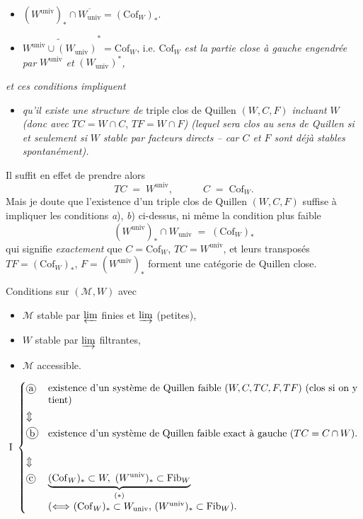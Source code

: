 \documentclass[11pt]{article}
\newcommand{\printedpage}[1]{\marginpar{\footnotesize p.~#1}}
\newcommand{\msp}[1]{\marginpar{\footnotesize [#1]}}
\newcommand{\Cof}{\mathrm{Cof}}
\newcommand{\Fib}{\mathrm{Fib}}
\newcommand{\univ}{\mathrm{univ}}
\newcommand{\cercle}[1]{\mbox{\tikz[baseline=(c.base)]\node[draw,circle,inner sep=1pt](c){#1};}}
\begin{document}
\msp{page 25}
\begin{itemize}[leftmargin=3em]
\item[\cercle{a}] $(W^{\univ})_* \cap \overline{W_{\univ}} = (\Cof_W)_*$.

\item[\cercle{b}] $\widetilde{W^{\univ} \cup (W_{\univ})}^{*} = \Cof_W$, i.e. $\Cof_W$ \textit{est la partie close à gauche engendrée par} $W^{\univ}$ \textit{et} $(W_{\univ})^*$\textit{,} %
\end{itemize}

\noindent\textit{et ces conditions impliquent}

\begin{itemize}[leftmargin=3em]
\item[\cercle{c}] \textit{qu'il existe une structure de} triple clos de Quillen $(W, C, F)$ \textit{incluant} $W$ \textit{(donc avec} $TC = W \cap C$, $TF = W \cap F$\textit{) (lequel sera clos au sens de Quillen si et seulement si} $W$ \textit{stable par facteurs directs -- car $C$ et $F$ sont déjà stables spontanément).}
\end{itemize}

\noindent Il suffit en effet de prendre alors
\[
TC \;=\; W^{\univ}, \qquad\quad C \;=\; \Cof_W .
\]
Mais je doute que l'existence d'un triple clos de Quillen $(W, C, F)$ suffise à impliquer les conditions \textit{a}), \textit{b}) ci-dessus, ni même la condition plus faible
\[
(W^{\univ})_* \cap W_{\univ} \;=\; (\Cof_W)_*
\]
qui signifie \textit{exactement} que $C = \Cof_W$, $TC = W^{\univ}$, et leurs transposés $TF = (\Cof_W)_*$, $F = (W^{\univ})_*$ forment une catégorie de Quillen close.

\clearpage
\printedpage{15}

\msp{page 26}
\noindent Conditions sur $(\mathcal{M}, W)$ avec
\begin{itemize}[leftmargin=3em]
\item[\textit{a})] $\mathcal{M}$ stable par $\varprojlim$ finies et $\varinjlim$ (petites),
\item[\textit{b})] $W$ stable par $\varinjlim$ filtrantes,
\item[\textit{c})] $\mathcal{M}$ accessible.
\end{itemize}

\[
\mathrm{I}\ \left\{
\begin{array}{@{}l@{\quad}p{11cm}@{}}
\cercle{a} & existence d'un système de Quillen faible $(W, C, TC, F, TF)$ (clos si on y tient) \\[1ex]
\Updownarrow & \\[1ex]
\cercle{b} & existence d'un système de Quillen faible exact à gauche ($TC = C \cap W$). \\[1ex]
\Updownarrow & \\[1ex]
\cercle{c} & $\underbrace{(\Cof_W)_* \subset W,\ (W^{\univ})_* \subset \Fib_W}_{(*)}$\newline ($\Longleftrightarrow$ $(\Cof_W)_* \subset W_{\univ}$, $(W^{\univ})_* \subset \Fib_W$).
\end{array}\right.
\]
\end{document}

